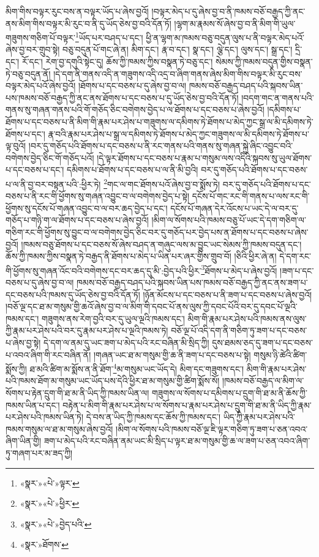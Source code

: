 མིག་གིས་བལྟར་རུང་བས་ན་བལྟར་ཡོད་པ་ཞེས་བྱའོ། །བལྟར་མེད་པ་དུ་ཞེས་བྱ་བ་ནི་ཁམས་བཅོ་བརྒྱད་ཀྱི་ནང་ནས་མིག་གིས་བལྟར་མི་རུང་བ་ནི་དུ་ཡོད་ཅེས་བྱ་བའི་དོན་ཏོ། །ལྷག་མ་རྣམས་སོ་ཞེས་བྱ་བ་ནི་མིག་གི་ཡུལ་གཟུགས་གཅིག་པོ་བལྟར་\footnote{«སྣར་»«པེ་»ལྟར་}ཡོད་པར་བཤད་པ་དང་། ཕྱི་ན་ལྷག་མ་ཁམས་བཅུ་བདུན་ལུས་པ་ནི་བལྟར་མེད་པའོ་ཞེས་བྱ་བར་གྲུབ་སྟེ། བཅུ་བདུན་པོ་གང་ཞེ་ན། མིག་དང་། རྣ་བ་དང་། སྣ་དང་། ལྕེ་དང་། ལུས་དང་། སྒྲ་དང་། དྲི་དང་། རོ་དང་། རེག་བྱ་དགུའི་སྟེང་དུ། ཆོས་ཀྱི་ཁམས་ཀྱིས་བསྣན་ཏེ་བཅུ་དང་། སེམས་ཀྱི་ཁམས་བདུན་གྱིས་བསྣན་ཏེ་བཅུ་བདུན་ནོ། །དེ་དག་ནི་གནས་འདི་ན་གཟུགས་འདི་འདྲ་བ་ཞིག་གནས་ཞེས་མིག་གིས་བལྟར་མི་རུང་བས་བལྟར་མེད་པའོ་ཞེས་བྱའོ། །ཐོགས་པ་དང་བཅས་པ་དུ་ཞེས་བྱ་བ་ལ། ཁམས་བཅོ་བརྒྱད་བཤད་པའི་སྐབས་ཡིན་པས་ཁམས་བཅོ་བརྒྱད་ཀྱི་ནང་ནས་ཐོགས་པ་དང་བཅས་པ་དུ་ཡོད་ཅེས་བྱ་བའི་དོན་ཏོ། །བདག་གང་ན་གནས་པའི་གནས་སུ་གཞན་གནས་པའི་གོ་གཅོད་ཅིང་བགེགས་བྱེད་པ་ལ་ཐོགས་པ་དང་བཅས་པ་ཞེས་བྱའོ། །དམིགས་པ་ཐོགས་པ་དང་བཅས་པ་ནི་མིག་གི་རྣམ་པར་ཤེས་པ་གཟུགས་ལ་དམིགས་ཏེ་ཐོགས་པ་མེད་ཀྱང་སྒྲ་ལ་མི་དམིགས་ཏེ་ཐོགས་པ་དང་། རྣ་བའི་རྣམ་པར་ཤེས་པ་སྒྲ་ལ་དམིགས་ཏེ་ཐོགས་པ་མེད་ཀྱང་གཟུགས་ལ་མི་དམིགས་ཏེ་ཐོགས་པ་ལྟ་བུའོ། །བར་དུ་གཅོད་པའི་ཐོགས་པ་དང་བཅས་པ་ནི་རང་གནས་པའི་གནས་སུ་གཞན་སྐྱེ་ཞིང་འབྱུང་བའི་བགེགས་བྱེད་ཅིང་གོ་གཅོད་པའོ། །དེ་ལྟར་ཐོགས་པ་དང་བཅས་པ་རྣམ་པ་གསུམ་ལས་འདིའི་སྐབས་སུ་ཡུལ་ཐོགས་པ་དང་བཅས་པ་དང་། དམིགས་པ་ཐོགས་པ་དང་བཅས་པ་ལ་ནི་མི་བྱའི། བར་དུ་གཅོད་པའི་ཐོགས་པ་དང་བཅས་པ་ལ་ནི་བྱ་བར་བསྟན་པའི་:ཕྱིར་ཏེ། \footnote{«སྣར་»«པེ་»ཕྱིར་}གང་ལ་གང་ཐོགས་པའོ་ཞེས་བྱ་བ་སྨོས་ཏེ། བར་དུ་གཅོད་པའི་ཐོགས་པ་དང་བཅས་པ་ནི་རང་གི་ཕྱོགས་སུ་གཞན་འབྱུང་བ་ལ་བགེགས་བྱེད་པ་སྟེ། དངོས་པོ་གང་རང་གི་གནས་པ་ལས་རང་གི་ཕྱོགས་སུ་དངོས་པོ་གཞན་འབྱུང་བ་ལ་བར་ཆད་བྱེད་པ་དང་། དངོས་པོ་གཞན་དེར་འོངས་པ་ཡང་དེ་ལ་བར་དུ་གཅོད་པ་གཉི་ག་ལ་ཐོགས་པ་དང་བཅས་པ་ཞེས་བྱའོ། །མིག་ལ་སོགས་པའི་ཁམས་བཅུ་པོ་ཡང་དེ་དག་གཅིག་ལ་གཅིག་རང་གི་ཕྱོགས་སུ་བྱུང་བ་ལ་བགེགས་བྱེད་ཅིང་བར་དུ་གཅོད་པར་བྱེད་པས་ན་ཐོགས་པ་དང་བཅས་པ་ཞེས་བྱའོ། །ཁམས་བཅུ་ཐོགས་པ་དང་བཅས་སོ་ཞེས་བཤད་ན་གཞུང་ལས་མ་བྱུང་ཡང་སེམས་ཀྱི་ཁམས་བདུན་དང་། ཆོས་ཀྱི་ཁམས་ཀྱིས་བསྣན་ཏེ་བརྒྱད་ནི་ཐོགས་པ་མེད་པ་ཡིན་པར་ཞར་གྱིས་གྲུབ་བོ། །ཅིའི་ཕྱིར་ཞེ་ན། དེ་དག་རང་གི་ཕྱོགས་སུ་གཞན་འོང་བའི་བགེགས་དང་བར་ཆད་དུ་མི་:བྱེད་པའི་ཕྱིར་\footnote{«སྣར་»«པེ་»བྱེད་པའི་}ཐོགས་པ་མེད་པ་ཞེས་བྱའོ། །ཟག་པ་དང་བཅས་པ་དུ་ཞེས་བྱ་བ་ལ། ཁམས་བཅོ་བརྒྱད་བཤད་པའི་སྐབས་ཡིན་པས་ཁམས་བཅོ་བརྒྱད་ཀྱི་ནང་ནས་ཟག་པ་དང་བཅས་པའི་ཁམས་དུ་ཡོད་ཅེས་བྱ་བའི་དོན་ཏོ། །ཉོན་མོངས་པ་དང་བཅས་པ་ནི་ཟག་པ་དང་བཅས་པ་ཞེས་བྱའོ། །བཅོ་ལྔ་དང་ཐ་མ་གསུམ་གྱི་ཆའོ་ཞེས་བྱ་བ་ལ་མིག་གི་དབང་པོ་ནས་ལུས་ཀྱི་དབང་པོའི་བར་དུ་དབང་པོ་ལྔའི་ཁམས་དང་། གཟུགས་ནས་རེག་བྱའི་བར་དུ་ཡུལ་ལྔའི་ཁམས་དང་། མིག་གི་རྣམ་པར་ཤེས་པའི་ཁམས་ནས་ལུས་ཀྱི་རྣམ་པར་ཤེས་པའི་བར་དུ་རྣམ་པར་ཤེས་པ་ལྔའི་ཁམས་ཏེ། བཅོ་ལྔ་པོ་འདི་དག་ནི་གཅིག་ཏུ་ཟག་པ་དང་བཅས་པ་ཞེས་བྱ་སྟེ། དེ་དག་ལ་ནམ་དུ་ཡང་ཟག་པ་མེད་པའི་རང་བཞིན་མི་སྲིད་ཀྱི། དུས་ཐམས་ཅད་དུ་ཟག་པ་དང་བཅས་པ་འབའ་ཞིག་གི་རང་བཞིན་ནོ། །གཞན་ཡང་ཐ་མ་གསུམ་གྱི་ཆ་ནི་ཟག་པ་དང་བཅས་པ་སྟེ། གསུམ་ཉི་ཚེའི་ཚིག་སྨོས་ཀྱི། ཐ་མའི་ཚིག་མ་སྨོས་ན་ནི་ཐོག་\footnote{«སྣར་»ཐོགས་}མ་གསུམ་ཡང་ཡོད་དེ། མིག་དང་གཟུགས་དང་། མིག་གི་རྣམ་པར་ཤེས་པའི་ཁམས་ཐོག་མ་གསུམ་ཡང་ཡོད་པས་དེའི་ཕྱིར་ཐ་མ་གསུམ་གྱི་ཚིག་སྨོས་སོ། །ཁམས་བཅོ་བརྒྱད་ལ་མིག་ལ་སོགས་པ་རྟེན་དྲུག་གི་ཐ་མ་ནི་ཡིད་ཀྱི་ཁམས་ཡིན་ལ། གཟུགས་ལ་སོགས་པ་དམིགས་པ་དྲུག་གི་ཐ་མ་ནི་ཆོས་ཀྱི་ཁམས་ཡིན་པ་དང་། བརྟེན་པ་མིག་གི་རྣམ་པར་ཤེས་པ་ལ་སོགས་པ་རྣམ་པར་ཤེས་པ་དྲུག་གི་ཐ་མ་ནི་ཡིད་ཀྱི་རྣམ་པར་ཤེས་པའི་ཁམས་ཡིན་ཏེ། དེ་བས་ན་ཡིད་ཀྱི་ཁམས་དང་ཆོས་ཀྱི་ཁམས་དང་། ཡིད་ཀྱི་རྣམ་པར་ཤེས་པའི་ཁམས་གསུམ་ལ་ཐ་མ་གསུམ་ཞེས་བྱའོ། །མིག་ལ་སོགས་པའི་ཁམས་བཅོ་ལྔ་ཇི་ལྟར་གཅིག་ཏུ་ཟག་པ་ཅན་འབའ་ཞིག་ཡིན་གྱི། ཟག་པ་མེད་པའི་རང་བཞིན་ནམ་ཡང་མི་སྲིད་པ་ལྟར་ཐ་མ་གསུམ་གྱི་ཆ་ལ་ཟག་པ་ཅན་འབའ་ཞིག་ཏུ་གཞག་པར་མ་ཟད་ཀྱི། 